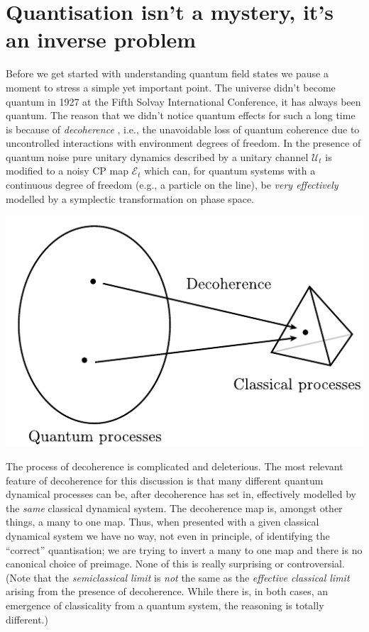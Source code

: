 \documentclass[11pt]{amsart}
\theoremstyle{plain}%
\theoremstyle{definition}
\theoremstyle{remark}
\begin{document}
\section{Quantisation isn't a mystery, it's an inverse problem}\label{sec:quant}
Before we get started with understanding quantum field states we pause a moment to stress a simple yet important point. The universe didn't become quantum in 1927 at the Fifth Solvay International Conference, it has always been quantum. The reason that we didn't notice quantum effects for such a long time is because of \emph{decoherence} \cite{joos_decoherence_2003,gardiner_quantum_2010}, i.e., the unavoidable loss of quantum coherence due to uncontrolled interactions with environment degrees of freedom. In the presence of quantum noise pure unitary dynamics described by a unitary channel $\mathcal{U}_t$ is modified to a noisy CP map $\mathcal{E}_t$ which can, for quantum systems with a continuous degree of freedom (e.g., a particle on the line), be \emph{very effectively} modelled by a symplectic transformation on phase space.
\begin{center}
\includegraphics{Decoherence.pdf}
\end{center}
The process of decoherence is complicated and deleterious. The most relevant feature of decoherence for this discussion is that many different quantum dynamical processes can be, after decoherence has set in, effectively modelled by the \emph{same} classical dynamical system. The decoherence map is, amongst other things, a many to one map. Thus, when presented with a given classical dynamical system we have no way, not even in principle, of identifying the ``correct'' quantisation; we are trying to invert a many to one map and there is no canonical choice of preimage.  None of this is really surprising or controversial. (Note that the \emph{semiclassical limit} is \emph{not} the same as the \emph{effective classical limit} arising from the presence of decoherence. While there is, in both cases, an emergence of classicality from a quantum system, the reasoning is totally different.)
\end{document}
